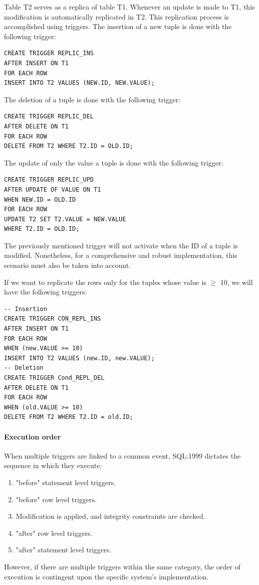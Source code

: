 \begin{example}
    Table T2 serves as a replica of table T1. 
    Whenever an update is made to T1, this modification is automatically replicated in T2. 
    This replication process is accomplished using triggers.
    The insertion of a new tuple is done with the following trigger: 
    \begin{lstlisting}[style=SQL]
CREATE TRIGGER REPLIC_INS
AFTER INSERT ON T1
FOR EACH ROW
INSERT INTO T2 VALUES (NEW.ID, NEW.VALUE);
    \end{lstlisting}
    The deletion of a tuple is done with the following trigger: 
    \begin{lstlisting}[style=SQL]
CREATE TRIGGER REPLIC_DEL
AFTER DELETE ON T1
FOR EACH ROW
DELETE FROM T2 WHERE T2.ID = OLD.ID;
    \end{lstlisting}
    The update of only the value a tuple is done with the following trigger: 
    \begin{lstlisting}[style=SQL]
CREATE TRIGGER REPLIC_UPD
AFTER UPDATE OF VALUE ON T1
WHEN NEW.ID = OLD.ID
FOR EACH ROW
UPDATE T2 SET T2.VALUE = NEW.VALUE
WHERE T2.ID = OLD.ID;
    \end{lstlisting}
    The previously mentioned trigger will not activate when the ID of a tuple is modified. 
    Nonetheless, for a comprehensive and robust implementation, this scenario must also be taken into account.

    If we want to replicate the rows only for the tuples whose value is $\geq$ 10, we will have the following triggers: 
    \begin{lstlisting}[style=SQL]
-- Insertion
CREATE TRIGGER CON_REPL_INS
AFTER INSERT ON T1
FOR EACH ROW
WHEN (new.VALUE >= 10)
INSERT INTO T2 VALUES (new.ID, new.VALUE);
-- Deletion
CREATE TRIGGER Cond_REPL_DEL
AFTER DELETE ON T1
FOR EACH ROW
WHEN (old.VALUE >= 10)
DELETE FROM T2 WHERE T2.ID = old.ID;
    \end{lstlisting}
\end{example}

\paragraph*{Execution order}
When multiple triggers are linked to a common event, SQL:1999 dictates the sequence in which they execute: 
\begin{enumerate}
    \item "before" statement level triggers. 
    \item "before" row level triggers. 
    \item Modification is applied, and integrity constraints are checked.
    \item "after" row level triggers. 
    \item "after" statement level triggers.
\end{enumerate}
However, if there are multiple triggers within the same category, the order of execution is contingent upon the specific system's implementation.

